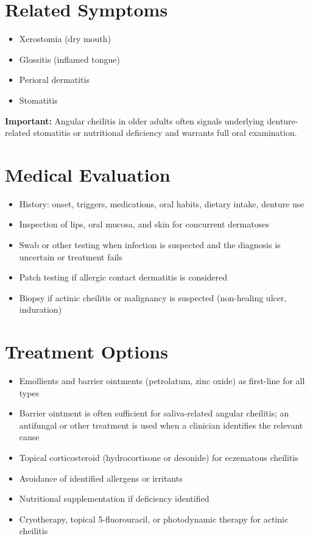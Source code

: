\section*{Related Symptoms}
\begin{itemize}
  \item Xerostomia (dry mouth)
  \item Glossitis (inflamed tongue)
  \item Perioral dermatitis
  \item Stomatitis
\end{itemize}
\textbf{Important:} Angular cheilitis in older adults often signals underlying denture-related stomatitis or nutritional deficiency and warrants full oral examination.

\section*{Medical Evaluation}
\begin{itemize}
  \item History: onset, triggers, medications, oral habits, dietary intake, denture use
  \item Inspection of lips, oral mucosa, and skin for concurrent dermatoses
  \item Swab or other testing when infection is suspected and the diagnosis is uncertain or treatment fails
  \item Patch testing if allergic contact dermatitis is considered
  \item Biopsy if actinic cheilitis or malignancy is suspected (non-healing ulcer, induration)
\end{itemize}

\section*{Treatment Options}
\begin{itemize}
  \item Emollients and barrier ointments (petrolatum, zinc oxide) as first-line for all types
  \item Barrier ointment is often sufficient for saliva-related angular cheilitis; an antifungal or other treatment is used when a clinician identifies the relevant cause
  \item Topical corticosteroid (hydrocortisone or desonide) for eczematous cheilitis
  \item Avoidance of identified allergens or irritants
  \item Nutritional supplementation if deficiency identified
  \item Cryotherapy, topical 5-fluorouracil, or photodynamic therapy for actinic cheilitis
\end{itemize}


